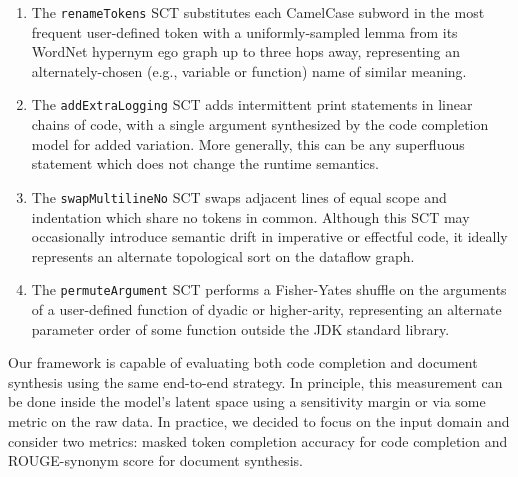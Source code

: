 \documentclass[usenames,dvipsnames]{article} %
\begin{document}
  \begin{enumerate}[itemsep=1ex]
    \item The \lstinline|renameTokens| SCT substitutes each CamelCase subword in the most frequent user-defined token with a uniformly-sampled lemma from its WordNet hypernym ego graph up to three hops away, representing an alternately-chosen (e.g., variable or function) name of similar meaning.
    \item The \lstinline|addExtraLogging| SCT adds intermittent print statements in linear chains of code, with a single argument synthesized by the code completion model for added variation. More generally, this can be any superfluous statement which does not change the runtime semantics.
    \item The \lstinline|swapMultilineNo| SCT swaps adjacent lines of equal scope and indentation which share no tokens in common. Although this SCT may occasionally introduce semantic drift in imperative or effectful code, it ideally represents an alternate topological sort on the dataflow graph.
    \item The \lstinline|permuteArgument| SCT performs a Fisher-Yates shuffle on the arguments of a user-defined function of dyadic or higher-arity, representing an alternate parameter order of some function outside the JDK standard library.
  \end{enumerate}


  Our framework is capable of evaluating both code completion and document synthesis using the same end-to-end strategy. In principle, this measurement can be done inside the model's latent space using a sensitivity margin or via some metric on the raw data. In practice, we decided to focus on the input domain and consider two metrics: masked token completion accuracy for code completion and ROUGE-synonym score for document synthesis.

  \pagebreak
\end{document}
